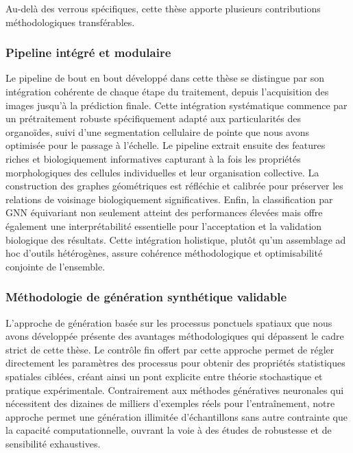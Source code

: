 Au-delà des verrous spécifiques, cette thèse apporte plusieurs contributions méthodologiques transférables.

\subsubsection{Pipeline intégré et modulaire}

Le pipeline de bout en bout développé dans cette thèse se distingue par son intégration cohérente de chaque étape du traitement, depuis l'acquisition des images jusqu'à la prédiction finale. Cette intégration systématique commence par un prétraitement robuste spécifiquement adapté aux particularités des organoïdes, suivi d'une segmentation cellulaire de pointe que nous avons optimisée pour le passage à l'échelle. Le pipeline extrait ensuite des features riches et biologiquement informatives capturant à la fois les propriétés morphologiques des cellules individuelles et leur organisation collective. La construction des graphes géométriques est réfléchie et calibrée pour préserver les relations de voisinage biologiquement significatives. Enfin, la classification par GNN équivariant non seulement atteint des performances élevées mais offre également une interprétabilité essentielle pour l'acceptation et la validation biologique des résultats. Cette intégration holistique, plutôt qu'un assemblage ad hoc d'outils hétérogènes, assure cohérence méthodologique et optimisabilité conjointe de l'ensemble.

\subsubsection{Méthodologie de génération synthétique validable}

L'approche de génération basée sur les processus ponctuels spatiaux que nous avons développée présente des avantages méthodologiques qui dépassent le cadre strict de cette thèse. Le contrôle fin offert par cette approche permet de régler directement les paramètres des processus pour obtenir des propriétés statistiques spatiales ciblées, créant ainsi un pont explicite entre théorie stochastique et pratique expérimentale. Contrairement aux méthodes génératives neuronales qui nécessitent des dizaines de milliers d'exemples réels pour l'entraînement, notre approche permet une génération illimitée d'échantillons sans autre contrainte que la capacité computationnelle, ouvrant la voie à des études de robustesse et de sensibilité exhaustives. 

